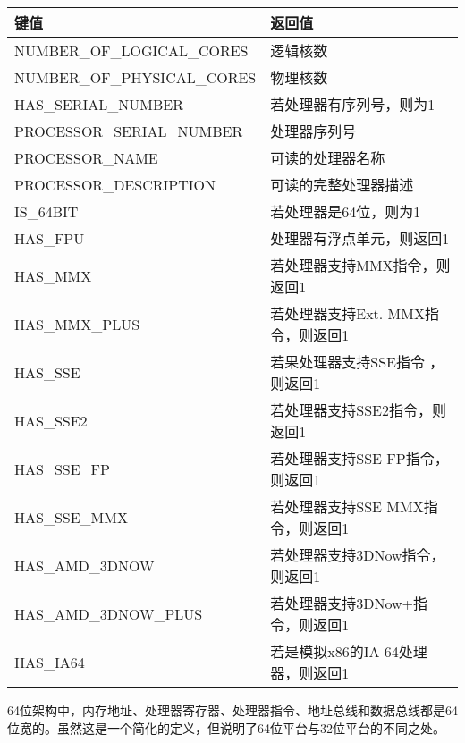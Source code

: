 \begin{table}[H]
	\begin{tabular}{|l|l|}
		\hline
		\textbf{键值}                & \textbf{返回值}                          \\ \hline
		NUMBER\_OF\_LOGICAL\_CORES  & 逻辑核数                      \\ \hline
		NUMBER\_OF\_PHYSICAL\_CORES & 物理核数                     \\ \hline
		HAS\_SERIAL\_NUMBER         & 若处理器有序列号，则为1           \\ \hline
		PROCESSOR\_SERIAL\_NUMBER   & 处理器序列号                      \\ \hline
		PROCESSOR\_NAME             & 可读的处理器名称                \\ \hline
		PROCESSOR\_DESCRIPTION      & 可读的完整处理器描述    \\ \hline
		IS\_64BIT                   & 若处理器是64位，则为1                     \\ \hline
		HAS\_FPU                    & 处理器有浮点单元，则返回1     \\ \hline
		HAS\_MMX                    & 若处理器支持MMX指令，则返回1     \\ \hline
		HAS\_MMX\_PLUS              & 若处理器支持Ext. MMX指令，则返回1 \\ \hline
		HAS\_SSE                    & 若果处理器支持SSE指令 ，则返回1     \\ \hline
		HAS\_SSE2                   & 若处理器支持SSE2指令，则返回1     \\ \hline
		HAS\_SSE\_FP                & 若处理器支持SSE FP指令，则返回1   \\ \hline
		HAS\_SSE\_MMX               & 若处理器支持SSE MMX指令，则返回1  \\ \hline
		HAS\_AMD\_3DNOW             & 若处理器支持3DNow指令，则返回1    \\ \hline
		HAS\_AMD\_3DNOW\_PLUS       & 若处理器支持3DNow+指令，则返回1   \\ \hline
		HAS\_IA64                   & 若是模拟x86的IA-64处理器，则返回1      \\ \hline
	\end{tabular}
\end{table}


64位架构中，内存地址、处理器寄存器、处理器指令、地址总线和数据总线都是64位宽的。虽然这是一个简化的定义，但说明了64位平台与32位平台的不同之处。

